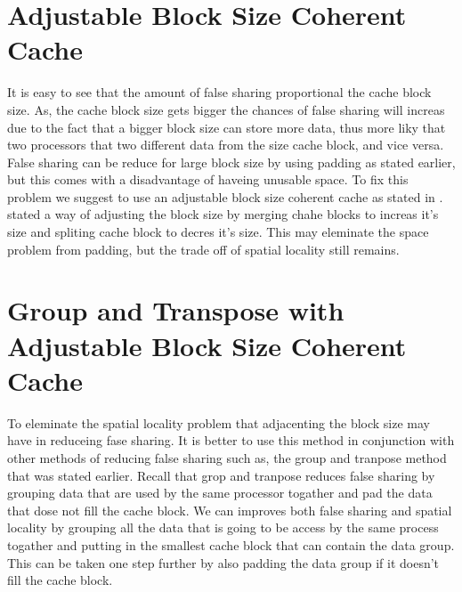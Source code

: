\section{Adjustable Block Size Coherent Cache}

It is easy to see that the amount of false sharing proportional the cache block size. As, the cache block size gets bigger the chances of false sharing will increas due to the fact that a bigger block size can store more data, thus more liky that two processors that two different data from the size cache block, and vice versa.
False sharing can be reduce for large block size by using padding as stated earlier, but this comes with a disadvantage of haveing unusable space.
To fix this problem we suggest to use an adjustable block size coherent cache as stated in \citealp*{dubnicki1992adjustable}.
\citealp*{dubnicki1992adjustable} stated a way of adjusting the block size by merging chahe blocks to increas it's size and spliting cache block to decres it's size.
This may eleminate the space problem from padding, but the trade off of spatial locality still remains. 

\section{Group and Transpose with Adjustable Block Size Coherent Cache}\label{sec:cobination}
To eleminate the spatial locality problem that adjacenting the block size may have in reduceing
fase sharing. It is better to use this method in conjunction with other methods of reducing false sharing such as, the group and tranpose method that was stated earlier. Recall that grop and tranpose reduces false sharing by grouping data that are used by the same processor togather and pad the data that dose not fill the cache block. We can improves both false sharing and spatial locality by grouping all the data that is going to be access by the same process togather and putting in the smallest cache block that can contain the data group.
This can be taken one step further by also padding the data group if it doesn't fill the cache block.

